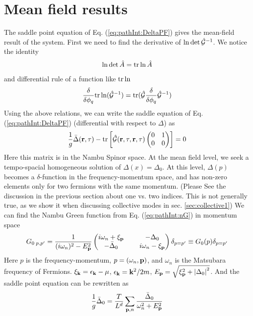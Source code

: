 \section{Mean field results\label{sec:pathInt:meanfield}}
The saddle point equation of Eq. (\ref{eq:pathInt:DeltaPF}) gives the mean-field result of the system.  First we need to find the derivative of $\ln\det\hat{\mathcal{G}}^{-1}$.  We notice the identity
\begin{equation}
\ln\det\hat{A}=\text{tr}\ln\hat{A}
\end{equation}
and differential rule of a function like $\text{tr}\ln$
\begin{equation}\label{eq:pathInt:diffTr}
\frac{\delta}{\delta\phi_q}\text{tr}\ln(\hat{\mathcal{G}}^{-1})=\text{tr}(\hat{\mathcal{G}}\frac{\delta}{\delta\phi_q}\hat{\mathcal{G}}^{-1})
\end{equation}
Using the above relations, we can write the saddle equation of Eq. (\ref{eq:pathInt:DeltaPF}) (differential with respect to $\Delta$) as
\begin{equation}
\frac{1}{g}\bar{\Delta}(\mathbf{r},\tau)-\text{tr}\left[\hat{\mathcal{G}}(\mathbf{r},\tau,\mathbf{r},\tau)\begin{pmatrix}0&1\\0&0\end{pmatrix}\right]=0
\end{equation}
Here this matrix is in the Nambu Spinor space.  At the  mean field level, we seek a tempo-spacial homogeneous solution of $\Delta(x)=\Delta_{0}$.  At this level,  $\Delta(p)$ becomes a $\delta$-function in the frequency-momentum space, and has non-zero elements only for two fermions with the same momentum.  (Please See the discussion in the previous section about one vs. two indices. This is not generally true, as we show it when discussing collective modes in sec. \ref{sec:collective1})
We can find the Nambu Green function from Eq. (\ref{eq:pathInt:nG}) in momentum space
\begin{equation}\label{eq:pathInt:G0}
G_{0\;p,p'}=\frac{1}{(i\omega_n)^2-E_{\mathbf{p}}^2}
\begin{pmatrix}
	i\omega_n+\xi_{\mathbf{p}}&\;&-\Delta_0\\
	-\bar{\Delta}_0&\;&i\omega_n-\xi_{\mathbf{p}}
\end{pmatrix}
\delta_{p=p'}
\equiv{}G_{0}(p)\delta_{p=p'}
\end{equation}
Here $p$ is the frequency-momentum, $p=(\omega_{n},\mathbf{p})$, and $\omega_n$ is the Matsubara frequency of Fermions.  $\xi_{\mathbf{k}}=\epsilon_{\mathbf{k}}-\mu$, $\epsilon_{\mathbf{k}}=\mathbf{k}^{2}/2m$,  $E_{\mathbf{p}}=\sqrt{\xi_{\mathbf{p}}^2+\left\lvert{\Delta_0}\right\rvert^2}$.  And the saddle point equation can be rewritten as 
\begin{equation}
\frac{1}{g}\bar{\Delta}_0=\frac{T}{L^d}\sum_{\mathbf{p},n}\frac{\bar\Delta_0}{\omega_n^2+E_{\mathbf{p}}^2}
\end{equation}
